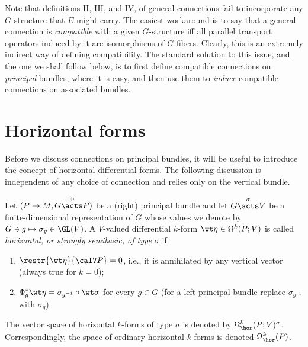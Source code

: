 \begin{rem}
    Note that definitions II, III, and IV, of general connections fail to incorporate any $G$-structure that $E$ might carry. The easiest workaround is to say that a general connection is \emph{compatible} with a given $G$-structure iff all parallel transport operators induced by it are isomorphisms of $G$-fibers. Clearly, this is an extremely indirect way of defining compatibility. The standard solution to this issue, and the one we shall follow below, is to first define compatible connections on \emph{principal} bundles, where it is easy, and then use them to \emph{induce} compatible connections on associated bundles.
\end{rem}







\section{Horizontal forms}

Before we discuss connections on principal bundles, it will be useful to introduce the concept of horizontal differential forms. The following discussion is independent of any choice of connection and relies only on the vertical bundle.

\begin{defn}
    Let $(P\to M,G\overset{\Phi}{\acts} P)$ be a (right) principal bundle and let $G\overset{\sigma}{\acts}V$ be a finite-dimensional representation of $G$ whose values we denote by $G\ni g\mapsto \sigma_g\in \GL(V)$. A $V$-valued differential $k$-form $\wt\eta\in\Omega^k(P;V)$ is called \emph{horizontal, or strongly semibasic, of type $\sigma$} if
    \begin{enumerate}
        \item $\restr{\wt\eta}{\calV P}=0$, i.e., it is annihilated by any vertical vector (always true for $k=0$);
        \item $\Phi_g^\ast \wt\eta=\sigma_{g^{-1}}\circ\wt\sigma$ for every $g\in G$ (for a left principal bundle replace $\sigma_{g^{-1}}$ with $\sigma_g$).
    \end{enumerate}
    The vector space of horizontal $k$-forms of type $\sigma$ is denoted by $\Omega^k_{\hor}(P;V)^\sigma$. Correspondingly, the space of ordinary horizontal $k$-forms is denoted $\Omega^k_{\hor}(P)$. 
\end{defn}


